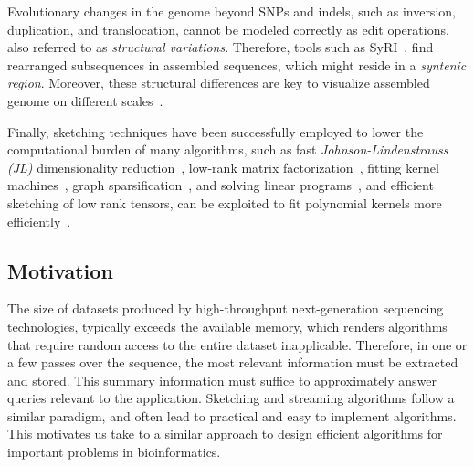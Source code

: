 Evolutionary changes in the genome beyond SNPs and indels, such as inversion, duplication, and translocation, cannot be modeled correctly as edit operations, also referred to as \emph{structural variations}. Therefore, tools such as SyRI~\cite{goel2019syri}, find rearranged subsequences in assembled sequences, which might reside in a \emph{syntenic region}. Moreover, these structural differences are key to visualize assembled genome on different scales~\cite{Yokoyama2019MoMI}. 


Finally, sketching techniques have been successfully employed to lower the computational burden of many algorithms, such as fast \emph{Johnson-Lindenstrauss (JL)} dimensionality reduction~\cite{AILON2007THENEIGHBORS}, low-rank matrix factorization~\cite{tropp2017practical,yurtsever2017sketchy}, fitting kernel machines~\cite{rahimi2008random}, graph sparsification~\cite{spielman2011spectral}, and solving linear programs~\cite{cohen2019solving}, and efficient sketching of low rank tensors, can be exploited to fit polynomial kernels more efficiently~\cite{pham2013fast}. 


\subsection{Motivation}

The size of datasets produced by  high-throughput next-generation sequencing technologies, typically exceeds the available memory, which renders algorithms that require random access to the entire dataset inapplicable.
Therefore, in one or a few passes over the sequence, the most relevant information must be extracted and stored. 
This summary information must suffice to approximately answer queries relevant to the application.  
Sketching and streaming algorithms follow a similar paradigm, and often lead to practical and easy to implement algorithms. This motivates us take to a similar approach to design efficient algorithms for important problems in bioinformatics. 
